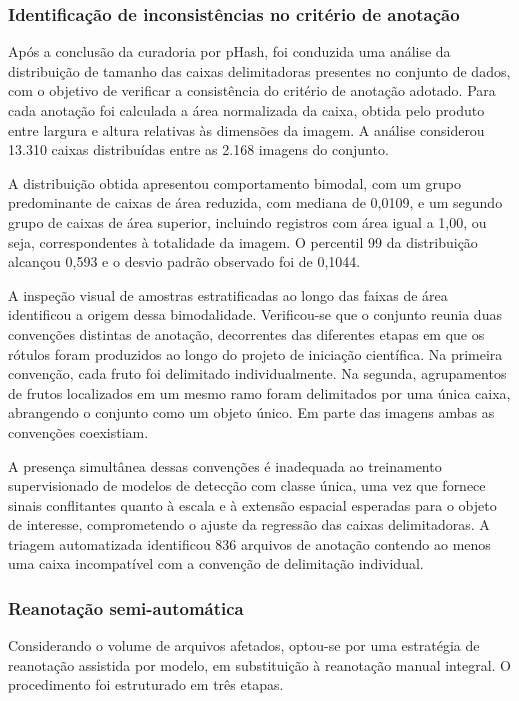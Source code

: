 \documentclass[artigo,times,capa]{iftex2024}
\begin{document}
\subsubsection{Identificação de inconsistências no critério de anotação}

Após a conclusão da curadoria por pHash, foi conduzida uma análise da
distribuição de tamanho das caixas delimitadoras presentes no conjunto de
dados, com o objetivo de verificar a consistência do critério de anotação
adotado. Para cada anotação foi calculada a área normalizada da caixa,
obtida pelo produto entre largura e altura relativas às dimensões da
imagem. A análise considerou 13.310 caixas distribuídas entre as 2.168
imagens do conjunto.

A distribuição obtida apresentou comportamento bimodal, com um grupo
predominante de caixas de área reduzida, com mediana de 0,0109, e um
segundo grupo de caixas de área superior, incluindo registros com
área igual a 1,00, ou seja, correspondentes à totalidade da imagem. O
percentil 99 da distribuição alcançou 0,593 e o desvio padrão observado
foi de 0,1044.

A inspeção visual de amostras estratificadas ao longo das faixas de área
identificou a origem dessa bimodalidade. Verificou-se que o conjunto
reunia duas convenções distintas de anotação, decorrentes das diferentes
etapas em que os rótulos foram produzidos ao longo do projeto de iniciação
científica. Na primeira convenção, cada fruto foi delimitado
individualmente. Na segunda, agrupamentos de frutos localizados em um
mesmo ramo foram delimitados por uma única caixa, abrangendo o conjunto
como um objeto único. Em parte das imagens ambas as convenções coexistiam.

A presença simultânea dessas convenções é inadequada ao treinamento
supervisionado de modelos de detecção com classe única, uma vez que
fornece sinais conflitantes quanto à escala e à extensão espacial
esperadas para o objeto de interesse, comprometendo o ajuste da regressão
das caixas delimitadoras. A triagem automatizada identificou 836 arquivos
de anotação contendo ao menos uma caixa incompatível com a convenção de
delimitação individual.

\subsubsection{Reanotação semi-automática}

Considerando o volume de arquivos afetados, optou-se por uma estratégia de
reanotação assistida por modelo, em substituição à reanotação manual
integral. O procedimento foi estruturado em três etapas.
\end{document}
